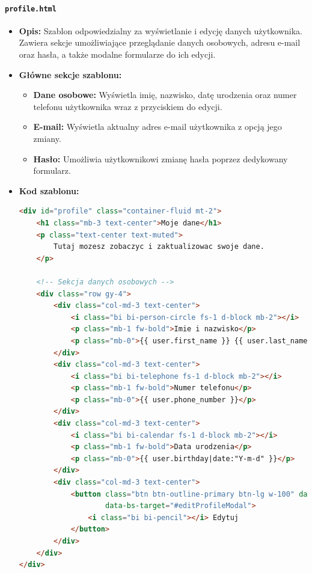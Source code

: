 \documentclass[12pt,a4paper,oneside]{article}
\theoremstyle{definition}
\numberwithin{equation}{section}
\begin{document}
\paragraph{\texttt{profile.html}}
\begin{itemize}
    \item \textbf{Opis:} Szablon odpowiedzialny za wyświetlanie i edycję danych użytkownika. Zawiera sekcje umożliwiające 
    przeglądanie danych osobowych, adresu e-mail oraz hasła, a także modalne formularze do ich edycji.
    \item \textbf{Główne sekcje szablonu:}
        \begin{itemize}
            \item \textbf{Dane osobowe:}
            Wyświetla imię, nazwisko, datę urodzenia oraz numer telefonu użytkownika wraz z przyciskiem do edycji.
            \item \textbf{E-mail:}
            Wyświetla aktualny adres e-mail użytkownika z opcją jego zmiany.
            \item \textbf{Hasło:}
            Umożliwia użytkownikowi zmianę hasła poprzez dedykowany formularz.
        \end{itemize}
    \item \textbf{Kod szablonu:}
        \begin{lstlisting}[language=HTML, caption=Fragment szablonu \texttt{profile.html}]
<div id="profile" class="container-fluid mt-2">
    <h1 class="mb-3 text-center">Moje dane</h1>
    <p class="text-center text-muted">
        Tutaj mozesz zobaczyc i zaktualizowac swoje dane.
    </p>
    
    <!-- Sekcja danych osobowych -->
    <div class="row gy-4">
        <div class="col-md-3 text-center">
            <i class="bi bi-person-circle fs-1 d-block mb-2"></i>
            <p class="mb-1 fw-bold">Imie i nazwisko</p>
            <p class="mb-0">{{ user.first_name }} {{ user.last_name }}</p>
        </div>
        <div class="col-md-3 text-center">
            <i class="bi bi-telephone fs-1 d-block mb-2"></i>
            <p class="mb-1 fw-bold">Numer telefonu</p>
            <p class="mb-0">{{ user.phone_number }}</p>
        </div>
        <div class="col-md-3 text-center">
            <i class="bi bi-calendar fs-1 d-block mb-2"></i>
            <p class="mb-1 fw-bold">Data urodzenia</p>
            <p class="mb-0">{{ user.birthday|date:"Y-m-d" }}</p>
        </div>
        <div class="col-md-3 text-center">
            <button class="btn btn-outline-primary btn-lg w-100" data-bs-toggle="modal"
                    data-bs-target="#editProfileModal">
                <i class="bi bi-pencil"></i> Edytuj
            </button>
        </div>
    </div>
</div>
        \end{lstlisting}


\end{itemize}
\end{document}

